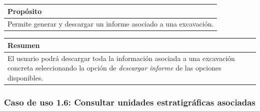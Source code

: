     \begin{table}[H]
        \centering
        \begin{tabularx}{\textwidth}{@{} |L |@{}} \hline
            \textbf{Propósito} \\
            \hline
            Permite generar y descargar un informe asociado a una excavación. \\
            \hline
        \end{tabularx}
    \end{table}

    \begin{table}[H]
        \centering
        \begin{tabularx}{\textwidth}{@{} |L |@{}} \hline
            \textbf{Resumen} \\
            \hline
            El usuario podrá descargar toda la información asociada a una excavación
            concreta seleccionando la opción de \textit{descargar informe} de las
            opciones disponibles. \\
            \hline
        \end{tabularx}
    \end{table}

\subsubsection{Caso de uso 1.6: Consultar unidades estratigráficas asociadas}

